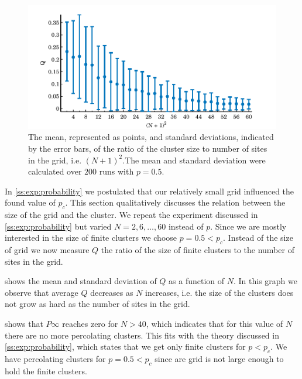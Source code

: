 \begin{figure}
	\centering
	\includegraphics[width=\textwidth]{./img/assignment_b_mean_std_n.pdf}
	\caption{The mean, represented as points, and standard deviations, indicated by the error bars, of the ratio of the cluster size to number of sites in the grid, i.e. $(N + 1)^2$.The mean and standard deviation were calculated over $200$ runs with $p = 0.5$.}
	\label{fig:experiment:size:mean_std_clusters}
\end{figure}

In \cref{ss:exp:probability} we postulated that our relatively small grid influenced the found value of $p_c$. This section qualitatively discusses the relation between the size of the grid and the cluster. We repeat the experiment discussed in \cref{ss:exp:probability} but varied $N = 2, 6, \dotsc, 60$ instead of $p$. Since we are mostly interested in the size of finite clusters we choose $p = 0.5 < p_c$. Instead of the size of grid we now measure $Q$ the ratio of the size of finite clusters to the number of sites in the grid. 

 shows the mean and standard deviation of $Q$ as a function of $N$. In this graph we observe that average $Q$ decreases as $N$ increases, i.e. the size of the clusters does not grow as hard as the number of sites in the grid.  

 shows that $P\infty$ reaches zero for $N > 40$, which indicates that for this value of $N$ there are no more percolating clusters. This fits with the theory discussed in \cref{ss:exp:probability}, which states that we get only finite clusters for $p < p_c$. We have percolating clusters for $p = 0.5 < p_c$ since are grid is not large enough to hold the finite clusters.\\ 

